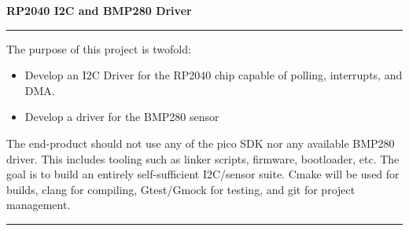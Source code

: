 \documentclass{article}
\newcommand{\breakerline}[0]{\begin{center} \noindent \rule{\linewidth}{0.4pt} \end{center}}
\begin{document}
\begin{flushright}
	\textbf{RP2040 I2C and BMP280 Driver} \\
\end{flushright} 

\breakerline

\noindent The purpose of this project is twofold: 
\begin{itemize}
	\item Develop an I2C Driver for the RP2040 chip capable of polling, interrupts, and DMA.
	\item Develop a driver for the BMP280 sensor
\end{itemize}

The end-product should not use any of the pico SDK nor any available BMP280 driver. This includes tooling such as linker scripts, firmware, bootloader, etc. The goal is to build an entirely self-sufficient I2C/sensor suite. Cmake will be used for builds, clang for compiling, Gtest/Gmock for testing, and git for project management.

\breakerline
\end{document}
